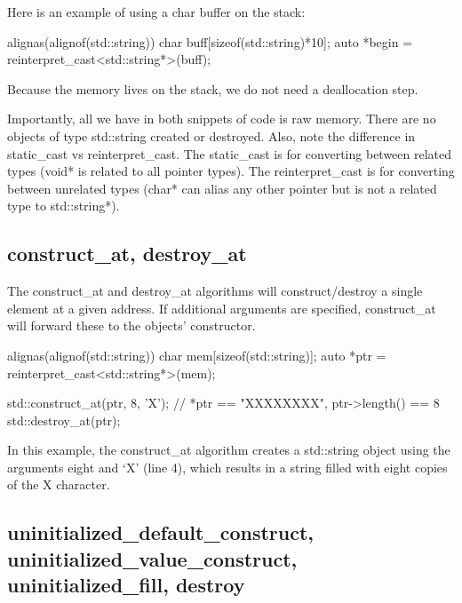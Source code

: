 Here is an example of using a char buffer on the stack:

\begin{box-note}
\begin{cppcode}
alignas(alignof(std::string)) char buff[sizeof(std::string)*10];
auto *begin = reinterpret_cast<std::string*>(buff);
\end{cppcode}
\end{box-note}

Because the memory lives on the stack, we do not need a deallocation step.

Importantly, all we have in both snippets of code is raw memory. There are no objects of type std::string created or destroyed. Also, note the difference in static\_cast vs reinterpret\_cast. The static\_cast is for converting between related types (void* is related to all pointer types). The reinterpret\_cast is for converting between unrelated types (char* can alias any other pointer but is not a related type to std::string*).

\subsection{construct\_at, destroy\_at}

The construct\_at and destroy\_at algorithms will construct/destroy a single element at a given address. If additional arguments are specified, construct\_at will forward these to the objects’ constructor.


\begin{box-note}
\begin{cppcode}
alignas(alignof(std::string)) char mem[sizeof(std::string)];
auto *ptr = reinterpret_cast<std::string*>(mem);

std::construct_at(ptr, 8, 'X');
// *ptr == "XXXXXXXX", ptr->length() == 8
std::destroy_at(ptr);
\end{cppcode}
\end{box-note}

In this example, the construct\_at algorithm creates a std::string object using the arguments eight and ‘X’ (line 4), which results in a string filled with eight copies of the X character.

\subsection{uninitialized\_default\_construct, uninitialized\_value\_construct, uninitialized\_fill, destroy}

